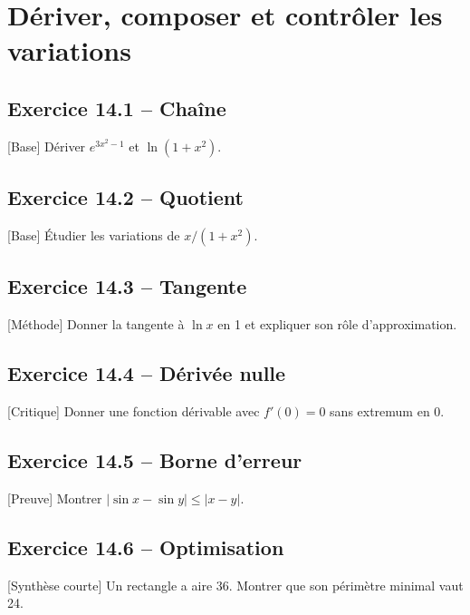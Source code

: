 \chapter{Dériver, composer et contrôler les variations}
\section*{Exercice 14.1 -- Chaîne}
[Base] Dériver $e^{3x^2-1}$ et $\ln(1+x^2)$.

\section*{Exercice 14.2 -- Quotient}
[Base] Étudier les variations de $x/(1+x^2)$.

\section*{Exercice 14.3 -- Tangente}
[Méthode] Donner la tangente à $\ln x$ en 1 et expliquer son rôle d'approximation.

\section*{Exercice 14.4 -- Dérivée nulle}
[Critique] Donner une fonction dérivable avec $f'(0)=0$ sans extremum en 0.

\section*{Exercice 14.5 -- Borne d’erreur}
[Preuve] Montrer $|\sin x-\sin y|\le|x-y|$.

\section*{Exercice 14.6 -- Optimisation}
[Synthèse courte] Un rectangle a aire 36. Montrer que son périmètre minimal vaut 24.
